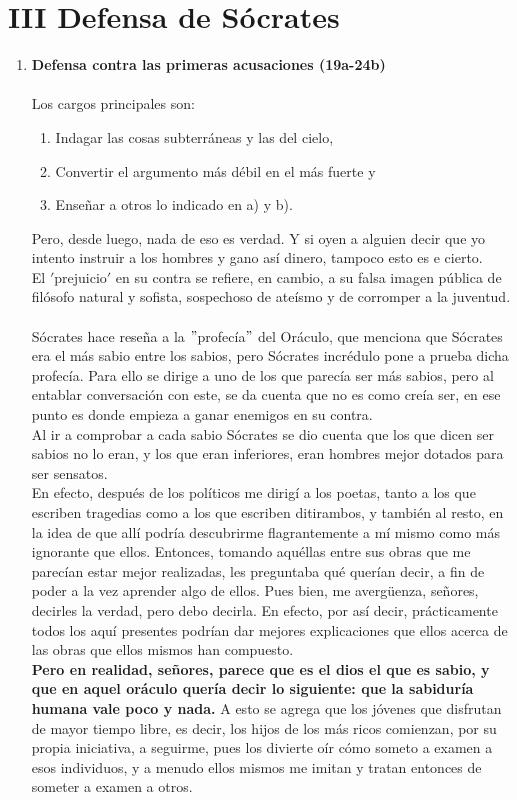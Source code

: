 \section*{\center III Defensa de Sócrates}
\begin{multicols}{2}

    \begin{enumerate}[\bfseries 1.]
	\item \textbf{Defensa contra las primeras acusaciones (19a-24b)}\\\\
	    Los cargos principales son:
	    \begin{enumerate}[\bfseries a.]
		\item Indagar las cosas subterráneas y las del cielo,
		\item Convertir el argumento más débil en el más fuerte y
		\item Enseñar a otros lo indicado en a) y b).
	    \end{enumerate}

	Pero, desde luego, nada de eso es verdad. Y si oyen a alguien decir que yo intento instruir a los hombres y gano así dinero, tampoco esto es e cierto. \\ 
	El $'$prejuicio$'$ en su contra se refiere, en cambio, a su falsa imagen pública de filósofo natural y sofista, sospechoso de ateísmo y de corromper a la juventud.\\\\
	Sócrates hace reseña a la $"$profecía$"$ del Oráculo, que menciona que Sócrates era el más sabio entre los sabios, pero Sócrates incrédulo pone a prueba dicha profecía. Para ello se dirige a uno de los que parecía ser más sabios, pero al entablar conversación con este, se da cuenta que no es como creía ser, en ese punto es donde empieza a ganar enemigos en su contra.\\
	Al ir a comprobar a cada sabio Sócrates se dio cuenta que los que dicen ser sabios no lo eran, y los que eran inferiores, eran hombres mejor dotados para ser sensatos.\\
	En efecto, después de los políticos me dirigí a los poetas, tanto a los que escriben tragedias como a los que escriben ditirambos, y también al resto, en la idea de que allí podría descubrirme flagrantemente a mí mismo como más ignorante que ellos. Entonces, tomando aquéllas entre sus obras que me parecían estar mejor realizadas, les preguntaba qué querían decir, a fin de poder a la vez aprender algo de ellos. Pues bien, me avergüenza, señores, decirles la verdad, pero debo decirla. En efecto, por así decir, prácticamente todos los aquí presentes podrían dar mejores explicaciones que ellos acerca de las obras que ellos mismos han compuesto.\\
	\textbf{Pero en realidad, señores, parece que es el dios el que es sabio, y que en aquel oráculo quería decir lo siguiente: que la sabiduría humana vale poco y nada.} A esto se agrega que los jóvenes que disfrutan de mayor tiempo libre, es decir, los hijos de los más ricos comienzan, por su propia iniciativa, a seguirme, pues los divierte oír cómo someto a examen a esos individuos, y a menudo ellos mismos me imitan y tratan entonces de someter a examen a otros.


\end{enumerate}
\end{multicols}
